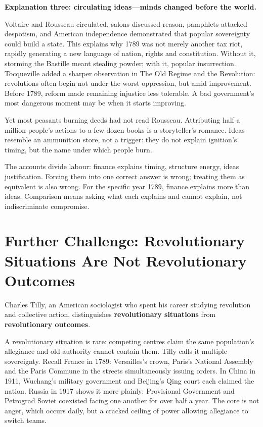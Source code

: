 \textbf{Explanation three: circulating ideas---minds changed before the world.}

Voltaire and Rousseau circulated, salons discussed reason, pamphlets attacked despotism, and American independence demonstrated that popular sovereignty could build a state. This explains why 1789 was not merely another tax riot, rapidly generating a new language of nation, rights and constitution. Without it, storming the Bastille meant stealing powder; with it, popular insurrection. Tocqueville added a sharper observation in The Old Regime and the Revolution: revolutions often begin not under the worst oppression, but amid improvement. Before 1789, reform made remaining injustice less tolerable. A bad government's most dangerous moment may be when it starts improving.

Yet most peasants burning deeds had not read Rousseau. Attributing half a million people's actions to a few dozen books is a storyteller's romance. Ideas resemble an ammunition store, not a trigger: they do not explain ignition's timing, but the name under which people burn.

The accounts divide labour: finance explains timing, structure energy, ideas justification. Forcing them into one correct answer is wrong; treating them as equivalent is also wrong. For the specific year 1789, finance explains more than ideas. Comparison means asking what each explains and cannot explain, not indiscriminate compromise.

\section[Further Challenge: Situations and Outcomes]{Further Challenge: Revolutionary Situations Are Not Revolutionary Outcomes}
Charles Tilly, an American sociologist who spent his career studying revolution and collective action, distinguishes \textbf{revolutionary situations} from \textbf{revolutionary outcomes}.

A revolutionary situation is rare: competing centres claim the same population's allegiance and old authority cannot contain them. Tilly calls it multiple sovereignty. Recall France in 1789: Versailles's crown, Paris's National Assembly and the Paris Commune in the streets simultaneously issuing orders. In China in 1911, Wuchang's military government and Beijing's Qing court each claimed the nation. Russia in 1917 shows it more plainly: Provisional Government and Petrograd Soviet coexisted facing one another for over half a year. The core is not anger, which occurs daily, but a cracked ceiling of power allowing allegiance to switch teams.

